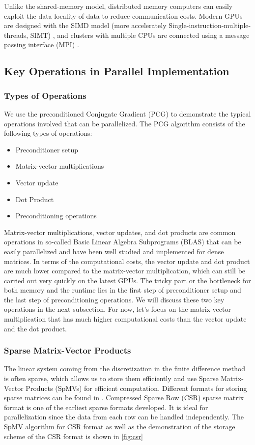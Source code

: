 Unlike the shared-memory model, distributed memory computers can easily exploit the data locality of data to reduce communication costs. Modern GPUs are designed with the SIMD model (more accelerately Single-instruction-multiple-threads, SIMT) \citep{owens2008gpu}, and clusters with multiple CPUs are connected using a message passing interface (MPI) \citep{barker2015message}.


\subsection{Key Operations in Parallel Implementation}
\subsubsection{Types of Operations}

We use the preconditioned Conjugate Gradient (PCG) to demonstrate the typical operations involved that can be parallelized. The PCG algorithm consists of the following types of operations:
\begin{itemize}
    \item Preconditioner setup
    \item Matrix-vector multiplications
    \item Vector update
    \item Dot Product
    \item Preconditioning operations
\end{itemize}

Matrix-vector multiplications, vector updates, and dot products are common operations in so-called Basic Linear Algebra Subprograms (BLAS) that can be easily parallelized and have been well studied and implemented for dense matrices\citep{10.1145/77626.79170,chtchelkanova1997parallel,freeman1992parallel}. In terms of the computational costs, the vector update and dot product are much lower compared to the matrix-vector multiplication, which can still be carried out very quickly on the latest GPUs. The tricky part or the bottleneck for both memory and the runtime lies in the first step of preconditioner setup and the last step of preconditioning operations. We will discuss these two key operations in the next subsection. For now, let's focus on the matrix-vector multiplication that has much higher computational costs than the vector update and the dot product.

\subsubsection{Sparse Matrix-Vector Products}
The linear system coming from the discretization in the finite difference method is often sparse, which allows us to store them efficiently and use Sparse Matrix-Vector Products (SpMVs) for efficient computation. Different formats for storing sparse matrices can be found in \citep{doi:10.1137/1.9780898718003}. Compressed Sparse Row (CSR) sparse matrix format is one of the earliest sparse formats developed. It is ideal for parallelization since the data from each row can be handled independently. The SpMV algorithm for CSR format as well as the demonstration of the storage scheme of the CSR format is shown in \autoref{fig:csr}

